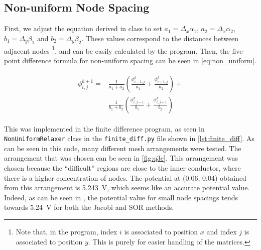 \documentclass[a4paper,titlepage]{article}
\begin{document}
	\subsection{Non-uniform Node Spacing}
	
	First, we adjust the equation derived in class to set $a_1 = \Delta_x\alpha_1$, $a_2 = \Delta_x\alpha_2$, $b_1 = \Delta_y\beta_1$ and $b_2 = \Delta_y\beta_2$. These values correspond to the distances between adjacent nodes \footnote{Note that, in the program, index $i$ is associated to position $x$ and index $j$ is associated to position $y$. This is purely for easier handling of the matrices.}, and can be easily calculated by the program. Then, the five-point difference formula for non-uniform spacing can be seen in \autoref{eq:non_uniform}.
	
	\begin{align} \label{eq:non_uniform}
		\begin{split}
			\phi^{k + 1}_{i,j} = 
			&\frac{1}{a_1 + a_2}\left(\frac{\phi^k_{i - 1,j}}{a_1} + \frac{\phi^k_{i + 1,j}}{a_2}\right) + \\
			&\frac{1}{b_1 + b_2}\left(\frac{\phi^k_{i, j - 1}}{b_1} + \frac{\phi^k_{i, j + 1}}{b_2}\right)
		\end{split}
	\end{align}
	
	This was implemented in the finite difference program, as seen in \texttt{NonUniformRelaxer} class in the \texttt{finite_diff.py} file shown in \autoref{lst:finite_diff}. As can be seen in this code, many different mesh arrangements were tested. The arrangement that was chosen can be seen in \autoref{fig:q3e}. This arrangement was chosen because the ``difficult'' regions are close to the inner conductor, where there is a higher concentration of nodes. The potential at (0.06, 0.04) obtained from this arrangement is \SI{5.243}{\volt}, which seems like an accurate potential value. Indeed, as can be seen in , the potential value for small node spacings tends towards \SI{5.24}{\volt} for both the Jacobi and SOR methods.
	
\end{document}
